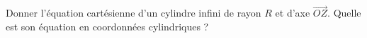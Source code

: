 
\begin{exercice}\label{exoOutilsMath-0011}

	Donner l'équation cartésienne d'un cylindre infini de rayon $R$ et d'axe $\overrightarrow{OZ}$. Quelle est son équation en coordonnées cylindriques ?

\end{exercice}
